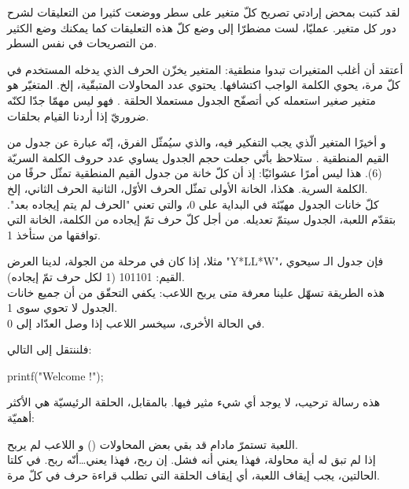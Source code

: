 لقد كتبت بمحض إرادتي تصريح كلّ متغير على سطر ووضعت كثيرا من التعليقات لشرح دور كل متغير. عمليّا، لست مضطرّا إلى وضع كلّ هذه التعليقات كما يمكنك وضع الكثير من التصريحات في نفس السطر.

أعتقد أن أغلب المتغيرات تبدوا منطقية: المتغير
يخزّن الحرف الذي يدخله المستخدم في كلّ مرة،
يحوي الكلمة الواجب اكتشافها.
يحتوي عدد المحاولات المتبقّية، إلخ. المتغيّر
هو متغير صغير استعمله كي أتصفّح الجدول مستعملا الحلقة
.
فهو ليس مهمّا جدّا لكنّه ضروريّ إذا أردنا القيام بحلقات.

و أخيرًا المتغير الّذي يجب التفكير فيه، والذي سيُمثّل الفرق، إنّه عبارة عن جدول من القيم المنطقية
.
ستلاحظ بأنّي جعلت حجم الجدول يساوي عدد حروف الكلمة السريّة (6). هذا ليس أمرًا عشوائيًا: إذ أن كلّ خانة من جدول القيم المنطقية  تمثّل حرفًا من الكلمة السرية. هكذا، الخانة الأولى تمثّل الحرف الأوّل، الثانية الحرف الثاني، إلخ.\\
كلّ خانات الجدول مهيّئة في البداية على 0، والتي تعني "الحرف لم يتم إيجاده بعد". بتقدّم اللعبة، الجدول سيتمّ تعديله. من أجل كلّ حرف تمّ إيجاده من الكلمة، الخانة التي توافقها من
ستأخذ 1.

مثلا، إذا كان في مرحلة من الجولة، لدينا العرض
"\textenglish{Y*LL*W}"،
فإن جدول الـ
سيحوي القيم: 101101 (1 لكل حرف تمّ إيجاده).\\
هذه الطريقة تسهّل علينا معرفة متى يربح اللاعب: يكفي التحقّق من أن جميع خانات الجدول لا تحوي سوى 1.\\
في الحالة الأخرى، سيخسر اللاعب إذا وصل العدّاد
إلى 0.

فلننتقل إلى التالي:

\begin{Csource}
printf("Welcome !\n\n");
\end{Csource}

هذه رسالة ترحيب، لا يوجد أي شيء مثير فيها. بالمقابل، الحلقة الرئيسيّة هي  الأكثر أهميّة:

\begin{Csource}
while (remainingTries  > 0 && !win(foundLetter))
{
\end{Csource}

اللعبة تستمرّ مادام قد بقي بعض المحاولات
()
و اللاعب لم يربح.\\
إذا لم تبق له أية محاولة، فهذا يعني أنه فشل. إن ربح، فهذا يعني\dots أنّه ربح. في كلتا الحالتين، يجب إيقاف اللعبة، أي إيقاف الحلقة التي تطلب قراءة حرف في كلّ مرة.

